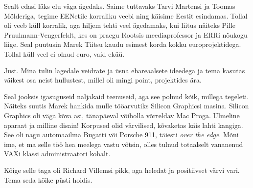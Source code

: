 Sealt edasi läks elu väga ägedaks. Saime tuttavaks Tarvi 
Martensi ja Toomas 
Mölderiga, tegime EENetile korraliku veebi ning käisime Eestit esindamas. Tollal oli veeb küll korralik, 
aga hiljem tehti veel ägedamaks, kui liitus näiteks Pille 
Pruulmann-Vengerfeldt, kes on praegu
Rootsis meediaprofessor ja 
ERRi nõukogu 
liige. Seal puutusin Marek Tiitsu kaudu esimest 
korda kokku europrojektidega. Tollal küll veel ei olnud euro, vaid eküü. 


Just. Mina tulin lagedale veidrate ja üsna ebareaalsete
ideedega ja tema kasutas väikest osa neist hullustest, millel oli mingi point, projektides ära.


Seal jooksis igasuguseid naljakaid teenuseid, aga see polnud kõik, millega tegeleti. 
Näiteks suutis Marek hankida mulle tööarvutiks Silicon 
Graphicsi masina. Silicon Graphics oli väga kõva asi, tänapäeval 
võibolla võrreldav Mac Proga. Ulmeline aparaat ja milline disain! 
Korpused olid värvilised, kõvaketas 
käis lahti kangiga. See oli nagu automaailma 
Bugatti või Porsche 911, täiesti \emph{over the 
edge}. Mõni ime, et ma selle töö hea meelega vastu võtsin, olles tulnud 
totaalselt vananenud VAXi klassi administraatori kohalt.

Kõige selle taga oli Richard Villemsi pikk, aga heledat ja positiivset 
värvi vari. Tema seda kõike püsti hoidis.



